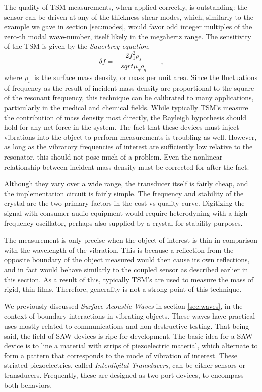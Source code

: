 \documentclass[a4paper,10pt]{report}
\numberwithin{equation}{section}
\begin{document}
{\begin{section}
The quality of TSM measurements, when applied correctly, is outstanding: the sensor can be driven at any of the thickness shear modes, which, similarly to the example we gave in section \ref{sec:modes}, would favor odd integer multiples of the zero-th modal wave-number, itself likely in the megahertz range. The sensitivity of the TSM is given by the \emph{Sauerbrey equation},\cite[p.~44]{Ballantine1997}
\begin{equation*}
\delta f = - \frac{2 f_1^2 \rho_s}{sqrt{\mu_q \rho_q}} \qquad \text{,}
\end{equation*}
where $\rho_s$\  is the surface mass density, or mass per unit area. Since the fluctuations of frequency as the result of incident mass density are proportional to the square of the resonant frequency, this technique can be calibrated to many applications, particularly in the medical and chemical fields. While typically TSM's measure the contribution of mass density most directly, the Rayleigh hypothesis should hold for any net force in the system. The fact that these devices must inject vibrations into the object to perform measurements is troubling as well. However, as long as the vibratory frequencies of interest are sufficiently low relative to the resonator, this should not pose much of a problem. Even the nonlinear relationship between incident mass density must be corrected for after the fact.
\par
Although they vary over a wide range, the transducer itself is fairly cheap, and the implementation circuit is fairly simple. The frequency and stability of the crystal are the two primary factors in the cost vs quality curve. Digitizing the signal with consumer audio equipment would require heterodyning with a high frequency oscillator, perhaps also supplied by a crystal for stability purposes.
\par
The measurement is only precise when the object of interest is thin in comparison with the wavelength of the vibration. This is because a reflection from the opposite boundary of the object measured would then cause its own reflections, and in fact would behave similarly to the coupled sensor as described earlier in this section. As a result of this, typically TSM's are used to measure the mass of rigid, thin films. Therefore, generality is not a strong point of this technique. 
\par
We previously discussed \emph{Surface Acoustic Waves} in section \ref{sec:waves}, in the context of boundary interactions in vibrating objects. These waves have practical uses mostly related to communications and non-destructive testing. That being said, the field of SAW devices is ripe for development. The basic idea for a SAW device is to line a material with strips of piezoelectric material, which alternate to form a pattern that corresponds to the mode of vibration of interest. These striated piezoelectrics, called \emph{Interdigital Transducers}, can be either sensors or transducers. Frequently, these are designed as two-port devices, to encompass both behaviors. \cite[p.~36]{Ballantine1997}

\end{section}}
\end{document}
